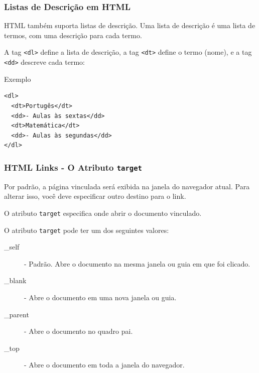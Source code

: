 \documentclass{beamer}
\begin{document}
\begin{frame}[fragile] %
  \frametitle{Listas de Descrição em HTML}

  HTML também suporta listas de descrição. Uma lista de descrição é uma lista de termos, com uma descrição para cada termo.

  A tag \verb|<dl>| define a lista de descrição, a tag \verb|<dt>| define o termo (nome), e a tag \verb|<dd>| descreve cada termo:

\begin{block}{Exemplo}
\begin{verbatim}
<dl>
  <dt>Portugês</dt>
  <dd>- Aulas às sextas</dd>
  <dt>Matemática</dt>
  <dd>- Aulas às segundas</dd>
</dl>
  \end{verbatim}
\end{block}

\end{frame}


\begin{frame}
  \frametitle{HTML Links - O Atributo \texttt{target}}

  Por padrão, a página vinculada será exibida na janela do navegador atual. Para alterar isso, você deve especificar outro destino para o link.

  O atributo \texttt{target} especifica onde abrir o documento vinculado.

  O atributo \texttt{target} pode ter um dos seguintes valores:

  \begin{description}
    \item[\_self] - Padrão. Abre o documento na mesma janela ou guia em que foi clicado.
    \item[\_blank] - Abre o documento em uma nova janela ou guia.
    \item[\_parent] - Abre o documento no quadro pai.
    \item[\_top] - Abre o documento em toda a janela do navegador.
  \end{description}
\end{frame}
\end{document}
